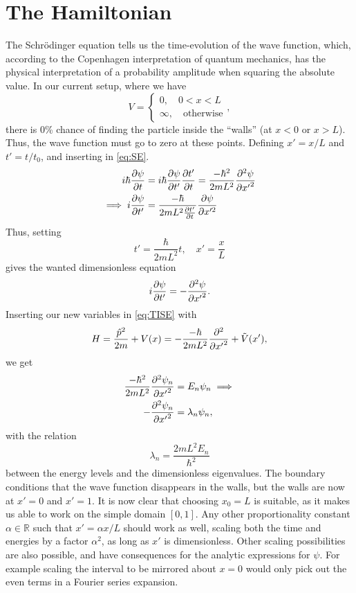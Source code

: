 \section{The Hamiltonian}

The Schrödinger equation tells us the time-evolution of the wave function, which, according to the Copenhagen interpretation of quantum mechanics, has the physical interpretation of a probability amplitude when squaring the absolute value. In our current setup, where we have
\begin{equation} 
V = \begin{cases}
0,\quad 0<x<L \\
\infty,\quad \text{otherwise}
\end{cases},
\end{equation}
there is 0\% chance of finding the particle inside the ``walls'' (at $x<0$ or $x> L$). Thus, the wave function must go to zero at these points. Defining $x' = x/L$ and $t'=t/t_0$, and inserting in \cref{eq:SE}.
\begin{align*} 
i\hbar\pdv{\psi}{t} &= i\hbar\pdv{\psi}{t'}\pdv{t'}{t}= \frac{-\hbar^2}{2mL^2}\pdv[2]{\psi}{{x'}}\\
\implies i\pdv{\psi}{t'} &= \frac{-\hbar}{2mL^2 \pdv{t'}{t}}\pdv{\psi}{x'^2}
\end{align*}
Thus, setting
\begin{equation}
t' = \frac{\hbar}{2mL^2}t,\quad x' = \frac{x}{L}
\end{equation}
gives the wanted dimensionless equation
\begin{equation}
\label{eq:SE_dimensionless}
i\pdv{\psi}{t'} = -\pdv[2]{\psi}{{x'}}.
\end{equation}
Inserting our new variables in \cref{eq:TISE} with \[H = \frac{\hat p^2}{2m} + V(x) =  -\frac{-\hbar}{2mL^2} \pdv[2]{{x'}} + \tilde{V}(x'),\] we get
\begin{align} 
\frac{-\hbar^2}{2mL^2}\pdv[2]{\psi_n}{{x'}} &= E_n\psi_n \implies \nonumber\\
\label{eq:eig}
-\pdv[2]{\psi_n}{{x'}} &= \lambda_n\psi_n,
\end{align}
with the relation 
\begin{equation} 
\lambda_n = \frac{2mL^2 E_n}{\hbar^2}
\end{equation}
between the energy levels and the dimensionless eigenvalues. The boundary conditions that the wave function disappears in the walls, but the walls are now at $x' = 0$ and $x' = 1$. It is now clear that choosing $x_0 = L$ is suitable, as it makes us able to work on the simple domain $[0,1]$. Any other proportionality constant $\alpha\in \mathbb{R}$ such that $x' = \alpha x/ L$ should work as well, scaling both the time and energies by a factor $\alpha^2 $, as long as $x'$ is dimensionless. Other scaling possibilities are also possible, and have consequences for the analytic expressions for $\psi$. For example scaling the interval to be mirrored about $x = 0$ would only pick out the even terms in a Fourier series expansion.

